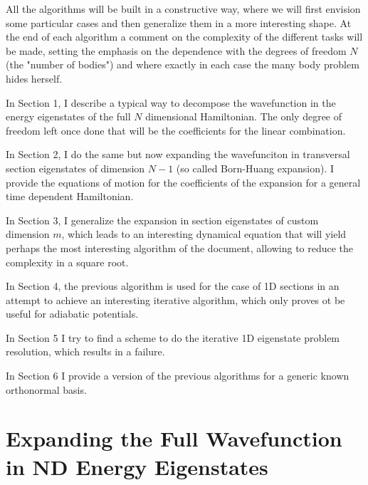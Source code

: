 \documentclass[11pt, a4paper]{article} %
\begin{document}
All the algorithms will be built in a constructive way, where we will first envision some particular cases and then generalize them in a more interesting shape. At the end of each algorithm a comment on the complexity of the different tasks will be made, setting the emphasis on the dependence with the degrees of freedom $N$ (the "number of bodies") and where exactly in each case the many body problem hides herself.

In Section 1, I describe a typical way to decompose the wavefunction in the energy eigenstates of the full $N$ dimensional Hamiltonian. The only degree of freedom left once done that will be the coefficients for the linear combination.

In Section 2, I do the same but now expanding the wavefunciton in transversal section eigenstates of dimension $N-1$ (so called Born-Huang expansion). I provide the equations of motion for the coefficients of the expansion for a general time dependent Hamiltonian.

In Section 3, I generalize the expansion in section eigenstates of custom dimension $m$, which leads to an interesting dynamical equation that will yield perhaps the most interesting algorithm of the document, allowing to reduce the complexity in a square root.

In Section 4, the previous algorithm is used for the case of 1D sections in an attempt to achieve an interesting iterative algorithm, which only proves ot be useful for adiabatic potentials.

In Section 5 I try to find a scheme to do the iterative 1D eigenstate problem resolution, which results in a failure.

In Section 6 I provide a version of the previous algorithms for a generic known orthonormal basis.



\newpage
\section{Expanding the Full Wavefunction in ND Energy Eigenstates}
\end{document}
